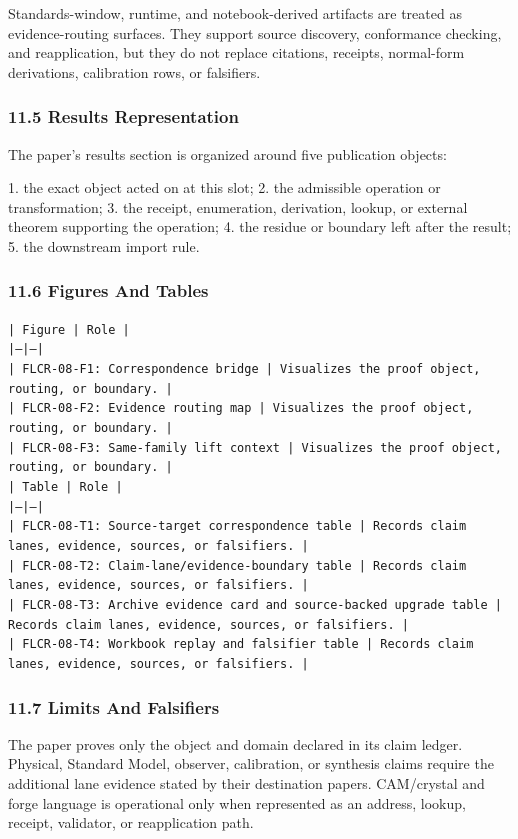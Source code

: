 \documentclass[11pt]{article}
\begin{document}
Standards-window, runtime, and notebook-derived artifacts are treated
as evidence-routing surfaces. They support source discovery, conformance
checking, and reapplication, but they do not replace citations, receipts,
normal-form derivations, calibration rows, or falsifiers.

\subsubsection*{11.5 Results Representation}

The paper's results section is organized around five publication objects:

1. the exact object acted on at this slot;
2. the admissible operation or transformation;
3. the receipt, enumeration, derivation, lookup, or external theorem supporting
   the operation;
4. the residue or boundary left after the result;
5. the downstream import rule.

\subsubsection*{11.6 Figures And Tables}

\noindent\texttt{| Figure | Role |}\\
\noindent\texttt{|---|---|}\\
\noindent\texttt{| FLCR-08-F1: Correspondence bridge | Visualizes the proof object, routing, or boundary. |}\\
\noindent\texttt{| FLCR-08-F2: Evidence routing map | Visualizes the proof object, routing, or boundary. |}\\
\noindent\texttt{| FLCR-08-F3: Same-family lift context | Visualizes the proof object, routing, or boundary. |}\\

\noindent\texttt{| Table | Role |}\\
\noindent\texttt{|---|---|}\\
\noindent\texttt{| FLCR-08-T1: Source-target correspondence table | Records claim lanes, evidence, sources, or falsifiers. |}\\
\noindent\texttt{| FLCR-08-T2: Claim-lane/evidence-boundary table | Records claim lanes, evidence, sources, or falsifiers. |}\\
\noindent\texttt{| FLCR-08-T3: Archive evidence card and source-backed upgrade table | Records claim lanes, evidence, sources, or falsifiers. |}\\
\noindent\texttt{| FLCR-08-T4: Workbook replay and falsifier table | Records claim lanes, evidence, sources, or falsifiers. |}\\

\subsubsection*{11.7 Limits And Falsifiers}

The paper proves only the object and domain declared in its claim ledger.
Physical, Standard Model, observer, calibration, or synthesis claims require
the additional lane evidence stated by their destination papers. CAM/crystal
and forge language is operational only when represented as an address, lookup,
receipt, validator, or reapplication path.
\end{document}
